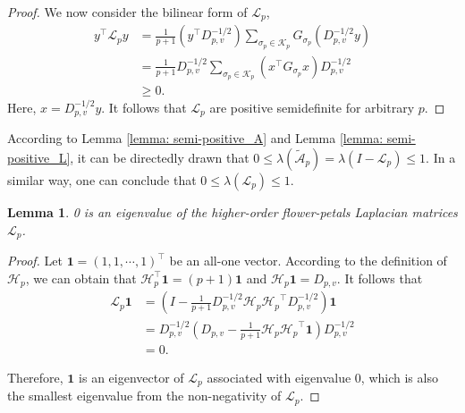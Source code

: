 \documentclass[letterpaper]{article} \usepackage{aaai24}
\theoremstyle{plain}
\newtheorem{lemma}[theorem]{Lemma}
\theoremstyle{definition}
\theoremstyle{remark}
\begin{document}
\begin{proof}
We now consider the bilinear form of $\mathcal{L}_p$,
\begin{equation}
    \begin{split}
        y^\top\mathcal{L}_p y  
        &= \frac{1}{p+1} \left(y^\top D_{p,v}^{-1/2}\right) \sum_{\sigma_p \in \mathcal{K}_p} G_{\sigma_p} \left(D_{p,v}^{-1/2}y\right)  \\
        & =\frac{1}{p+1}D_{p,v}^{-1/2} \sum_{\sigma_p \in \mathcal{K}_p} \left(x^\top G_{\sigma_p} x\right) D_{p,v}^{-1/2}  \\
        & \geq 0. 
    \end{split}
\end{equation}
Here, $x=D_{p,v}^{-1/2}y$. It follows that $\mathcal{L}_p$ are positive semidefinite for arbitrary $p$.
\end{proof}

According to Lemma \ref{lemma: semi-positive_A} and Lemma \ref{lemma: semi-positive_L}, it can be directedly drawn that $0 \leq \lambda(\tilde{\mathcal{A}}_p) = \lambda\left(I-\mathcal{L}_p\right)\leq 1$.
In a similar way, one can conclude that $0 \leq  \lambda\left(\mathcal{L}_p\right)\leq 1$.

\begin{lemma}
0 is an eigenvalue of the higher-order flower-petals Laplacian matrices $\mathcal{L}_p$.
\end{lemma}

\begin{proof}
Let $\boldsymbol{1}=(1,1,\cdots,1)^\top$ be an all-one vector. According to the definition of $\mathcal{H}_p$, we can obtain that $\mathcal{H}_p^\top\boldsymbol{1}=(p+1)\boldsymbol{1}$ and $\mathcal{H}_p \boldsymbol{1} = D_{p,v}$. It follows that
\begin{equation}
    \begin{split}
        \mathcal{L}_p\boldsymbol{1} 
        & = \left(I-\frac{1}{p+1}D_{p,v}^{-1/2}\mathcal{H}_p{\mathcal{H}_p}^\top D_{p,v}^{-1/2}\right)\boldsymbol{1} \\
        & = D_{p,v}^{-1/2}\left(D_{p,v}-\frac{1}{p+1}\mathcal{H}_p{\mathcal{H}_p}^\top\boldsymbol{1}\right)D_{p,v}^{-1/2}\\
        & =0.
    \end{split}
\end{equation}

Therefore, $\boldsymbol{1}$ is an eigenvector of $\mathcal{L}_p$ associated with eigenvalue 0, which is also the smallest eigenvalue from the non-negativity of $\mathcal{L}_p$.
\end{proof}
\end{document}
